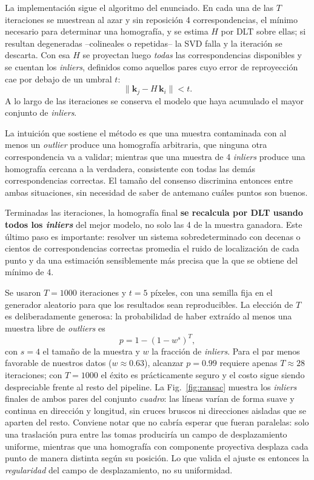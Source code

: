 \documentclass[conference]{IEEEtran}
\begin{document}
La implementación sigue el algoritmo del enunciado. En cada una de las $T$ iteraciones se muestrean al azar y sin reposición 4 correspondencias, el mínimo necesario para determinar una homografía, y se estima $H$ por DLT sobre ellas; si resultan degeneradas --colineales o repetidas-- la SVD falla y la iteración se descarta. Con esa $H$ se proyectan luego \emph{todas} las correspondencias disponibles y se cuentan los \textit{inliers}, definidos como aquellos pares cuyo error de reproyección cae por debajo de un umbral $t$:
\begin{equation}
\lVert \mathbf{k}_j - H\,\mathbf{k}_i \rVert < t .
\end{equation}
A lo largo de las iteraciones se conserva el modelo que haya acumulado el mayor conjunto de \textit{inliers}.

La intuición que sostiene el método es que una muestra contaminada con al menos un \textit{outlier} produce una homografía arbitraria, que ninguna otra correspondencia va a validar; mientras que una muestra de 4 \textit{inliers} produce una homografía cercana a la verdadera, consistente con todas las demás correspondencias correctas. El tamaño del consenso discrimina entonces entre ambas situaciones, sin necesidad de saber de antemano cuáles puntos son buenos.

Terminadas las iteraciones, la homografía final \textbf{se recalcula por DLT usando todos los \textit{inliers}} del mejor modelo, no solo las 4 de la muestra ganadora. Este último paso es importante: resolver un sistema sobredeterminado con decenas o cientos de correspondencias correctas promedia el ruido de localización de cada punto y da una estimación sensiblemente más precisa que la que se obtiene del mínimo de 4.

Se usaron $T=1000$ iteraciones y $t=5$ píxeles, con una semilla fija en el generador aleatorio para que los resultados sean reproducibles. La elección de $T$ es deliberadamente generosa: la probabilidad de haber extraído al menos una muestra libre de \textit{outliers} es
\begin{equation}
p = 1 - \left(1 - w^{s}\right)^{T},
\label{eq:ransac_prob}
\end{equation}
con $s=4$ el tamaño de la muestra y $w$ la fracción de \textit{inliers}. Para el par menos favorable de nuestros datos ($w\approx0.63$), alcanzar $p=0.99$ requiere apenas $T\approx28$ iteraciones; con $T=1000$ el éxito es prácticamente seguro y el costo sigue siendo despreciable frente al resto del pipeline. La Fig.~\ref{fig:ransac} muestra los \textit{inliers} finales de ambos pares del conjunto \textit{cuadro}: las líneas varían de forma suave y continua en dirección y longitud, sin cruces bruscos ni direcciones aisladas que se aparten del resto. Conviene notar que no cabría esperar que fueran paralelas: solo una traslación pura entre las tomas produciría un campo de desplazamiento uniforme, mientras que una homografía con componente proyectiva desplaza cada punto de manera distinta según su posición. Lo que valida el ajuste es entonces la \emph{regularidad} del campo de desplazamiento, no su uniformidad.
\end{document}
